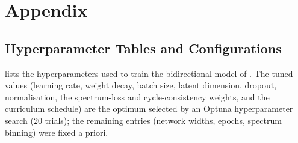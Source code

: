 \chapter{Appendix}
\label{ch:appendix}



\section{Hyperparameter Tables and Configurations}

 lists the hyperparameters used to train the bidirectional model of . The tuned values (learning rate, weight decay, batch size, latent dimension, dropout, normalisation, the spectrum-loss and cycle-consistency weights, and the curriculum schedule) are the optimum selected by an Optuna hyperparameter search ($20$ trials); the remaining entries (network widths, epochs, spectrum binning) were fixed a priori.

